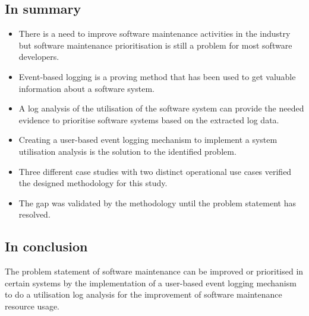\subsection{In summary}
\begin{itemize}
	\item There is a need to improve software maintenance activities in the industry but software
	maintenance prioritisation is still a problem for most software developers.
	\item Event-based logging is a proving method that has been used to get valuable information
	about a software system.
	\item A log analysis of the utilisation of the software system can provide the needed evidence
	to prioritise software systems based on the extracted log data.
	\item Creating a user-based event logging mechanism to implement a system utilisation analysis
	is the solution to the identified problem.
	\item Three different case studies with two distinct operational use cases verified the designed
	methodology for this study.
	\item The gap was validated by the methodology until the problem statement has resolved.
\end{itemize}

\subsection{In conclusion}
The problem statement of software maintenance can be improved or prioritised in certain systems by
the implementation of a user-based event logging mechanism to do a utilisation log analysis for the
improvement of software maintenance resource usage.